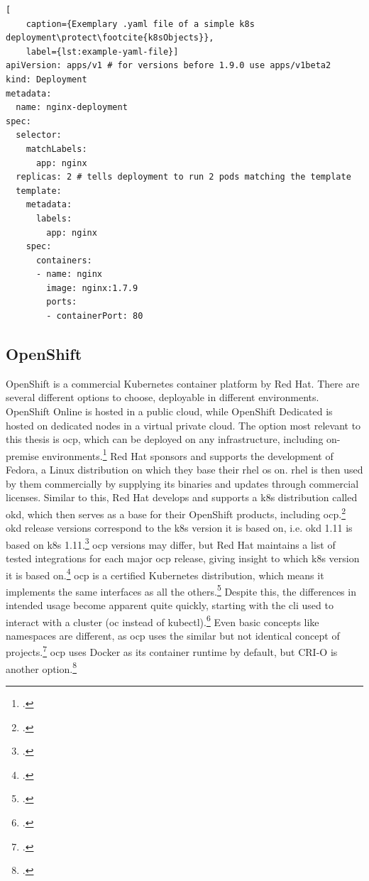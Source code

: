 \begin{lstlisting}[
	caption={Exemplary .yaml file of a simple k8s deployment\protect\footcite{k8sObjects}},
	label={lst:example-yaml-file}]
apiVersion: apps/v1 # for versions before 1.9.0 use apps/v1beta2
kind: Deployment
metadata:
  name: nginx-deployment
spec:
  selector:
    matchLabels:
      app: nginx
  replicas: 2 # tells deployment to run 2 pods matching the template
  template:
    metadata:
      labels:
        app: nginx
    spec:
      containers:
      - name: nginx
        image: nginx:1.7.9
        ports:
        - containerPort: 80
\end{lstlisting}


\subsection{OpenShift} \label{openshiftExplanation}

OpenShift is a commercial Kubernetes container platform by Red Hat. There are several different options to choose, deployable in different environments. OpenShift Online is hosted in a public cloud, while OpenShift Dedicated is hosted on dedicated nodes in a virtual private cloud. The option most relevant to this thesis is \gls{ocp}, which can be deployed on any infrastructure, including on-premise environments.\footcite[][, section 'OpenShift plans and pricing']{openShiftOptions}
Red Hat sponsors and supports the development of Fedora, a Linux distribution on which they base their \gls{rhel} \gls{os} on. \gls{rhel} is then used by them commercially by supplying its binaries and updates through commercial licenses.
Similar to this, Red Hat develops and supports a \gls{k8s} distribution called \gls{okd}, which then serves as a base for their OpenShift products, including \gls{ocp}.\footcite[][, section 'OKD vs Red Hat OpenShift']{ocpVsOkd}
\gls{okd} release versions correspond to the \gls{k8s} version it is based on, i.e. \gls{okd} 1.11 is based on \gls{k8s} 1.11.\footcite[][, section 'What is OKD?']{okd}
\gls{ocp} versions may differ, but Red Hat maintains a list of tested integrations for each major \gls{ocp} release, giving insight to which \gls{k8s} version it is based on.\footcite[][, table 'Platform Components']{ocpK8sVersions}
\gls{ocp} is a certified Kubernetes distribution, which means it implements the same interfaces as all the others.\footcite[][, table 'Platform - Certified Kubernetes - Distribution']{certifiedK8s}
Despite this, the differences in intended usage become apparent quite quickly, starting with the \gls{cli} used to interact with a cluster (oc instead of kubectl).\footcite[][, section 'Basic Setup and Login']{ocpCli}
Even basic concepts like namespaces are different, as \gls{ocp} uses the similar but not identical concept of projects.\footcite[][, section 'Overview']{ocpProjects}
\gls{ocp} uses Docker as its container runtime by default, but CRI-O is another option.\footcite[][, section 'Getting CRI-O']{ocpCrio}

